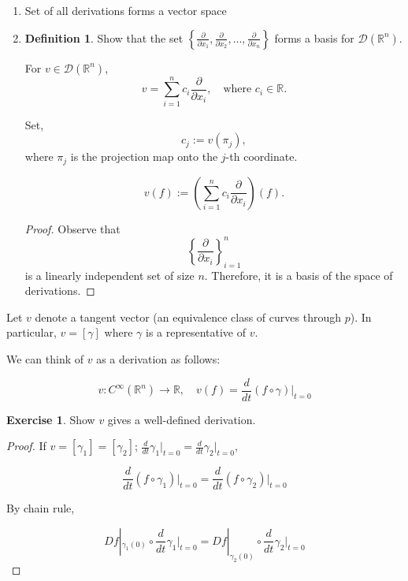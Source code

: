 \documentclass[11pt]{article}
\theoremstyle{definition}
\newtheorem{definition}{Definition}[section]
\newtheorem{exercise}{Exercise}
\theoremstyle{remark}
\begin{document}
\begin{enumerate}
    \item Set of all derivations forms a vector space

    \item \begin{definition}\label{def:derivation_basis}
        Show that the set $\left\{ \frac{\partial}{\partial x_1}, \frac{\partial}{\partial x_2}, \ldots, \frac{\partial}{\partial x_n} \right\}$ forms a basis for $\mathcal{D}(\mathbb{R}^n)$.
    \end{definition}

    For $v \in \mathcal{D}(\mathbb{R}^n)$,
    \[
    v = \sum_{i=1}^n c_i \frac{\partial}{\partial x_i}, \quad \text{where } c_i \in \mathbb{R}.
    \]

    Set,
    \[
    c_j := v(\pi_j),
    \]
    where $\pi_j$ is the projection map onto the $j$-th coordinate.

    \[
    v(f) := \left( \sum_{i=1}^n c_i \frac{\partial}{\partial x_i} \right) (f).
    \]

    \begin{proof}
    Observe that
    \[
    \left\{ \frac{\partial}{\partial x_i} \right\}_{i=1}^n
    \]
    is a linearly independent set of size $n$. Therefore, it is a basis of the space of derivations.
    \end{proof}
\end{enumerate}

Let $v$ denote a tangent vector (an equivalence class of curves through $p$).
In particular, $v = [\gamma]$ where $\gamma$ is a representative of $v$.

We can think of $v$ as a derivation as follows:

\[
v : C^\infty(\mathbb{R}^n) \to \mathbb{R}, \quad v(f) = \frac{d}{dt}(f \circ \gamma)\bigg|_{t=0}
\]

\begin{exercise}
Show $v$ gives a well-defined derivation.
\end{exercise}

\begin{proof}
If $v = [\gamma_1] = [\gamma_2]$; $\frac{d}{dt}\gamma_1\bigg|_{t=0} = \frac{d}{dt}\gamma_2\bigg|_{t=0}$,

\[
\frac{d}{dt}(f \circ \gamma_1)\bigg|_{t=0} = \frac{d}{dt}(f \circ \gamma_2)\bigg|_{t=0}
\]

By chain rule,

\[
Df|_{\gamma_1(0)} \circ \frac{d}{dt}\gamma_1\bigg|_{t=0} = Df|_{\gamma_2(0)} \circ \frac{d}{dt}\gamma_2\bigg|_{t=0}
\]
\end{proof}
\end{document}
